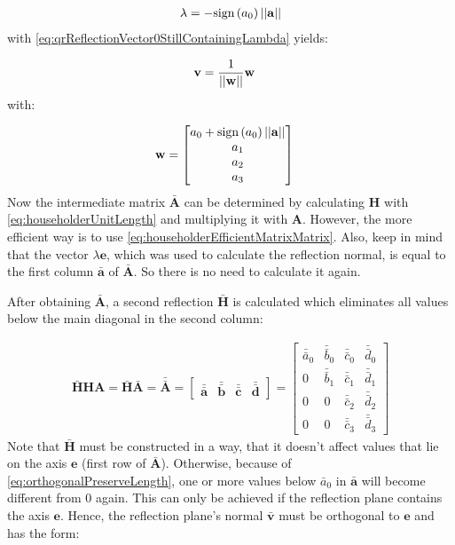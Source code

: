 \begin{align}
\lambda = -\textrm{sign}\left(a_0\right) \left\vert\left\vert\mathbf{a}\right\vert\right\vert
\end{align}
%
with \cref{eq:qrReflectionVector0StillContainingLambda} yields:



\begin{align}
\mathbf{v} 
&=
\frac{1}{\left\vert\left\vert\mathbf{w}\right\vert\right\vert}\mathbf{w}
\end{align}
%
with:

\begin{align}
\mathbf{w} 
&=
\begin{bmatrix}
a_0 + \textrm{sign}\left(a_0\right) \left\vert\left\vert\mathbf{a}\right\vert\right\vert\\
a_1\\
a_2\\
a_3
\end{bmatrix}
\end{align}
%
Now the intermediate matrix $\mathbf{\bar{A}}$ can be determined by calculating $\mathbf{H}$ with \cref{eq:householderUnitLength} and multiplying it with $\mathbf{A}$.
However, the more efficient way is to use \cref{eq:householderEfficientMatrixMatrix}.
Also, keep in mind that the vector $\lambda\mathbf{e}$, which was used to calculate the reflection normal, is equal to the first column $\mathbf{\bar{a}}$ of $\mathbf{\bar{A}}$.
So there is no need to calculate it again.

After obtaining $\mathbf{\bar{A}}$, a second reflection $\mathbf{\bar{H}}$ is calculated which eliminates all values below the main diagonal in the second column:

\begin{align}
\mathbf{\bar{H}}\mathbf{H}\mathbf{A} 
= 
\mathbf{\bar{H}}\mathbf{\bar{A}}
= 
\mathbf{\bar{\bar{A}}}
=
\begin{bmatrix}
\mathbf{\bar{\bar{a}}}&\mathbf{\bar{\bar{b}}}&\mathbf{\bar{\bar{c}}}&\mathbf{\bar{\bar{d}}}
\end{bmatrix}	
=
\begin{bmatrix}
\bar{\bar{a}}_0&\bar{\bar{b}}_0&\bar{\bar{c}}_0&\bar{\bar{d}}_0\\
0              &\bar{\bar{b}}_1&\bar{\bar{c}}_1&\bar{\bar{d}}_1\\
0              &0              &\bar{\bar{c}}_2&\bar{\bar{d}}_2\\
0              &0              &\bar{\bar{c}}_3&\bar{\bar{d}}_3
\end{bmatrix}					  
\end{align}
%
Note that $\mathbf{\bar{H}}$ must be constructed in a way, that it doesn't affect values that lie on the axis $\mathbf{e}$ (first row of $\mathbf{\bar{A}}$).
Otherwise, because of \cref{eq:orthogonalPreserveLength}, one or more values below $\bar{a}_0$ in $\mathbf{\bar{a}}$ will become different from 0 again.
This can only be achieved if the reflection plane contains the axis $\mathbf{e}$.
Hence, the reflection plane's normal $\mathbf{\bar{v}}$ must be orthogonal to $\mathbf{e}$ and has the form: 

